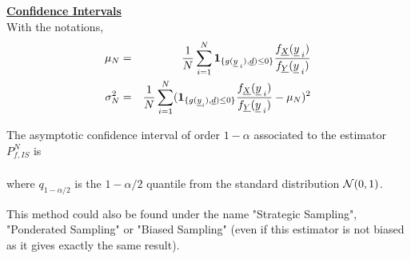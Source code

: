 {  \underline{\textbf{Confidence Intervals}}\\
  With the notations,
  \begin{eqnarray*}
    \mu_N &=& \frac{1}{N}\sum_{i=1}^N \mathbf{1}_{\{g(\underline{y}_{\:i}),\underline{d}) \leq 0 \}}\frac{f_{\underline{X}}(\underline{y}_{\:i})}{f_{\underline{Y}}(\underline{y}_{\:i})}\\
    \sigma_N^2 &=& \frac{1}{N}\sum_{i=1}^N (\mathbf{1}_{\{g(\underline{y}_i),\underline{d}) \leq 0 \}}\frac{f_{\underline{X}}(\underline{y}_{\:i})}{f_{\underline{Y}}(\underline{y}_{\:i})} - \mu_N)^2
  \end{eqnarray*}

  The asymptotic confidence interval of order $1-\alpha$ associated to the estimator $P_{f,IS}^N$ is
  \begin{align*}
    [ \mu_N - \frac{q_{1-\alpha / 2} . \sigma_N}{\sqrt{N}} \: ; \: \mu_N + \frac{q_{1-\alpha / 2} . \sigma_N}{\sqrt{N}} ]
  \end{align*}

  where $q_{1-\alpha /2}$ is the $1-\alpha / 2$ quantile from the standard distribution ${\mathcal N}(0,1)$.

}
{

  This method could also be found under the name "Strategic Sampling", "Ponderated Sampling" or "Biased Sampling" (even if this estimator is not biased as it gives exactly the same result).
}

